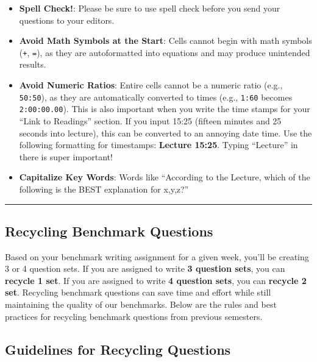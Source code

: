 \documentclass[
]{article}
\providecommand{\tightlist}{%
  \setlength{\itemsep}{0pt}\setlength{\parskip}{0pt}}
\begin{document}
\begin{itemize}
\tightlist
\item
  \textbf{Spell Check!}: Please be sure to use spell check before you send your questions to your editors.
\item
  \textbf{Avoid Math Symbols at the Start}: Cells cannot begin with math symbols (\texttt{+}, \texttt{=}), as they are autoformatted into equations and may produce unintended results.
\item
  \textbf{Avoid Numeric Ratios}: Entire cells cannot be a numeric ratio (e.g., \texttt{50:50}), as they are automatically converted to times (e.g., \texttt{1:60} becomes \texttt{2:00:00.00}). This is also important when you write the time stamps for your ``Link to Readings'' section. If you input 15:25 (fifteen minutes and 25 seconds into lecture), this can be converted to an annoying date time. Use the following formatting for timestamps: \textbf{Lecture 15:25}. Typing ``Lecture'' in there is super important!
\item
  \textbf{Capitalize Key Words}: Words like ``According to the Lecture, which of the following is the BEST explanation for x,y,z?''
\end{itemize}

\begin{center}\rule{0.5\linewidth}{0.5pt}\end{center}

\hypertarget{recycling-benchmark-questions}{%
\subsection{Recycling Benchmark Questions}\label{recycling-benchmark-questions}}

Based on your benchmark writing assignment for a given week, you'll be creating 3 or 4 question sets. If you are assigned to write \textbf{3 question sets}, you can \textbf{recycle 1 set}. If you are assigned to write \textbf{4 question sets}, you can \textbf{recycle 2 set}. Recycling benchmark questions can save time and effort while still maintaining the quality of our benchmarks. Below are the rules and best practices for recycling benchmark questions from previous semesters.

\hypertarget{guidelines-for-recycling-questions}{%
\subsection{Guidelines for Recycling Questions}\label{guidelines-for-recycling-questions}}
\end{document}
